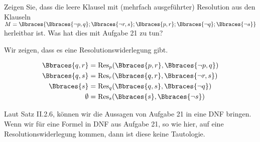 
\begin{exercise}[40]

Zeigen Sie, dass die leere Klausel mit (mehrfach ausgeführter) Resolution aus den Klauseln $M = \Bbraces{\Bbraces{\neg p, q}; \Bbraces{\neg r, s}; \Bbraces{p, r}; \Bbraces{\neg q}; \Bbraces{\neg s}}$ herleitbar ist.
Was hat dies mit Aufgabe 21 zu tun?

\end{exercise}


\begin{solution}

\phantom{}


Wir zeigen, dass es eine Resolutionswiderlegung gibt.

\begin{align*}
    \Bbraces{q, r}
    & =
    \mathrm{Res}_p(\Bbraces{p, r}, \Bbraces{\neg p, q}) \\
    \Bbraces{q, s}
    & =
    \mathrm{Res}_r(\Bbraces{q, r}, \Bbraces{\neg r, s}) \\
    \Bbraces{s}
    & =
    \mathrm{Res}_q(\Bbraces{q, s}, \Bbraces{\neg q}) \\
    \emptyset
    & =
    \mathrm{Res}_s(\Bbraces{s}, \Bbraces{\neg s})
\end{align*}


Laut Satz II.2.6, können wir die Aussagen von Aufgabe 21 in eine DNF bringen.
Wenn wir für eine Formel in DNF aus Aufgabe 21, so wie hier, auf eine Resolutionswiderlegung kommen, dann ist diese keine Tautologie.

\end{solution}


